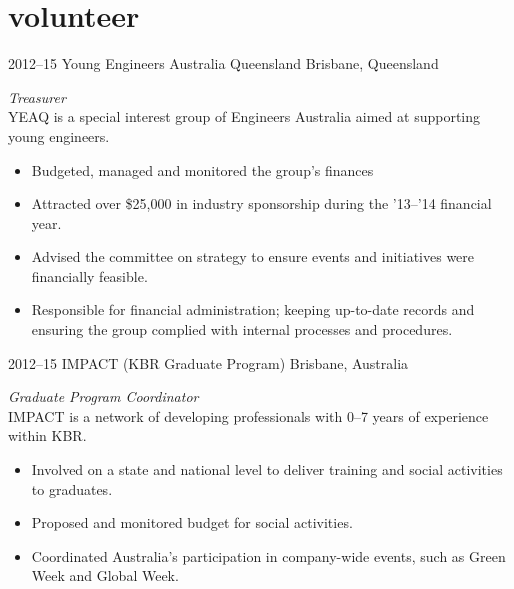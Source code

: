 
\section{volunteer}

\begin{entrylist}
\entry%
{2012--15}
{Young Engineers Australia Queensland}
{Brisbane, Queensland}
{\emph{Treasurer} \\
YEAQ is a special interest group of Engineers Australia aimed at supporting young engineers.
\begin{itemize}
\item Budgeted, managed and monitored the group's finances
\item Attracted over \$25,000 in industry sponsorship during the '13--'14 financial year.
\item Advised the committee on strategy to ensure events and initiatives were financially feasible.
\item Responsible for financial administration; keeping up-to-date records and ensuring the group complied with internal processes and procedures.
\end{itemize}}
\end{entrylist}

\begin{entrylist}
\entry%
{2012--15}
{IMPACT (KBR Graduate Program)}
{Brisbane, Australia}
{\emph{Graduate Program Coordinator} \\
IMPACT is a network of developing professionals with 0--7 years of experience within KBR.
\begin{itemize}
\item Involved on a state and national level to deliver training and social activities to graduates.
\item Proposed and monitored budget for social activities.
\item Coordinated Australia's participation in company-wide events, such as Green Week and Global Week.
\end{itemize}}
\end{entrylist}


